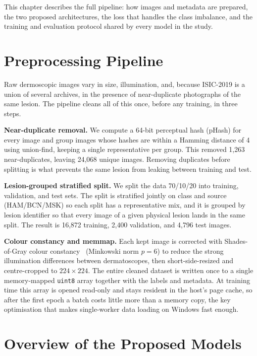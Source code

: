 This chapter describes the full pipeline: how images and metadata are prepared,
the two proposed architectures, the loss that handles the class imbalance, and
the training and evaluation protocol shared by every model in the study.

\section{Preprocessing Pipeline}

Raw dermoscopic images vary in size, illumination, and, because ISIC-2019 is
a union of several archives, in the presence of near-duplicate photographs of
the same lesion. The pipeline cleans all of this once, before any training, in
three steps.

\textbf{Near-duplicate removal.} We compute a 64-bit perceptual hash (pHash) for
every image and group images whose hashes are within a Hamming distance of 4
using union-find, keeping a single representative per group. This removed
1{,}263 near-duplicates, leaving 24{,}068 unique images. Removing duplicates
before splitting is what prevents the same lesion from leaking between training
and test.

\textbf{Lesion-grouped stratified split.} We split the data 70/10/20 into
training, validation, and test sets. The split is stratified jointly on class
and source (HAM/BCN/MSK) so each split has a representative mix, and it is
grouped by lesion identifier so that every image of a given physical lesion lands
in the same split. The result is 16{,}872 training, 2{,}400 validation, and
4{,}796 test images.

\textbf{Colour constancy and memmap.} Each kept image is corrected with
Shades-of-Gray colour constancy~\cite{finlayson2004shadesofgray} (Minkowski norm
$p=6$) to reduce the strong illumination differences between dermatoscopes,
then short-side-resized and centre-cropped to $224\times224$. The entire cleaned
dataset is written once to a single memory-mapped \texttt{uint8} array together
with the labels and metadata. At training time this array is opened read-only and
stays resident in the host's page cache, so after the first epoch a batch costs
little more than a memory copy, the key optimisation that makes single-worker
data loading on Windows fast enough.

\section{Overview of the Proposed Models}

